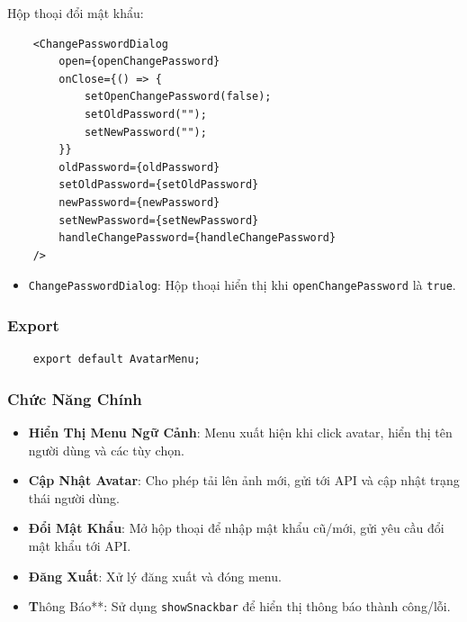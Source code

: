                 Hộp thoại đổi mật khẩu:
                \begin{lstlisting}
    <ChangePasswordDialog
        open={openChangePassword}
        onClose={() => {
            setOpenChangePassword(false);
            setOldPassword("");
            setNewPassword("");
        }}
        oldPassword={oldPassword}
        setOldPassword={setOldPassword}
        newPassword={newPassword}
        setNewPassword={setNewPassword}
        handleChangePassword={handleChangePassword}
    />
                \end{lstlisting}
                \begin{itemize}
                    \item \texttt{ChangePasswordDialog}: Hộp thoại hiển thị khi \texttt{openChangePassword} là \texttt{true}.
                \end{itemize}

            \subsubsection{Export}
                \begin{lstlisting}
    export default AvatarMenu;
                \end{lstlisting}
            \subsubsection{Chức Năng Chính}
                \begin{itemize}
                    \item \textbf{Hiển Thị Menu Ngữ Cảnh}: Menu xuất hiện khi click avatar, hiển thị tên người dùng và các tùy chọn.
                    \item \textbf{Cập Nhật Avatar}: Cho phép tải lên ảnh mới, gửi tới API và cập nhật trạng thái người dùng.
                    \item \textbf{Đổi Mật Khẩu}: Mở hộp thoại để nhập mật khẩu cũ/mới, gửi yêu cầu đổi mật khẩu tới API.
                    \item \textbf{Đăng Xuất}: Xử lý đăng xuất và đóng menu.
                    \item \textbf Thông Báo**: Sử dụng \texttt{showSnackbar} để hiển thị thông báo thành công/lỗi.
                \end{itemize}

